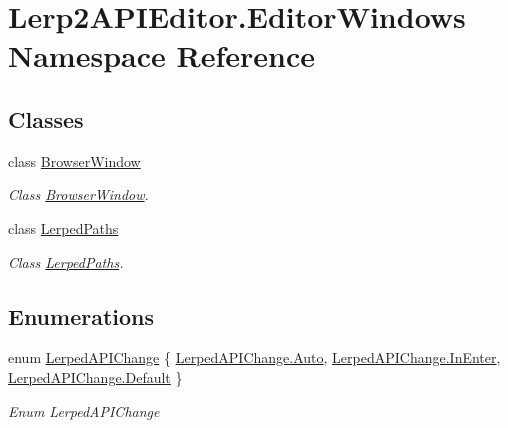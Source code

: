 \hypertarget{namespace_lerp2_a_p_i_editor_1_1_editor_windows}{}\section{Lerp2\+A\+P\+I\+Editor.\+Editor\+Windows Namespace Reference}
\label{namespace_lerp2_a_p_i_editor_1_1_editor_windows}
\subsection*{Classes}
\begin{DoxyCompactItemize}
\item 
class \hyperlink{class_lerp2_a_p_i_editor_1_1_editor_windows_1_1_browser_window}{Browser\+Window}
\begin{DoxyCompactList}\small\item\em Class \hyperlink{class_lerp2_a_p_i_editor_1_1_editor_windows_1_1_browser_window}{Browser\+Window}. \end{DoxyCompactList}\item 
class \hyperlink{class_lerp2_a_p_i_editor_1_1_editor_windows_1_1_lerped_paths}{Lerped\+Paths}
\begin{DoxyCompactList}\small\item\em Class \hyperlink{class_lerp2_a_p_i_editor_1_1_editor_windows_1_1_lerped_paths}{Lerped\+Paths}. \end{DoxyCompactList}\end{DoxyCompactItemize}
\subsection*{Enumerations}
\begin{DoxyCompactItemize}
\item 
enum \hyperlink{namespace_lerp2_a_p_i_editor_1_1_editor_windows_a7ebc015ae3bb1313ff6c2ba392ffe72c}{Lerped\+A\+P\+I\+Change} \{ \hyperlink{namespace_lerp2_a_p_i_editor_1_1_editor_windows_a7ebc015ae3bb1313ff6c2ba392ffe72ca06b9281e396db002010bde1de57262eb}{Lerped\+A\+P\+I\+Change.\+Auto}, 
\hyperlink{namespace_lerp2_a_p_i_editor_1_1_editor_windows_a7ebc015ae3bb1313ff6c2ba392ffe72ca72357623841fd796df0f9c7f0a142619}{Lerped\+A\+P\+I\+Change.\+In\+Enter}, 
\hyperlink{namespace_lerp2_a_p_i_editor_1_1_editor_windows_a7ebc015ae3bb1313ff6c2ba392ffe72ca7a1920d61156abc05a60135aefe8bc67}{Lerped\+A\+P\+I\+Change.\+Default}
 \}\begin{DoxyCompactList}\small\item\em Enum Lerped\+A\+P\+I\+Change \end{DoxyCompactList}
\end{DoxyCompactItemize}



